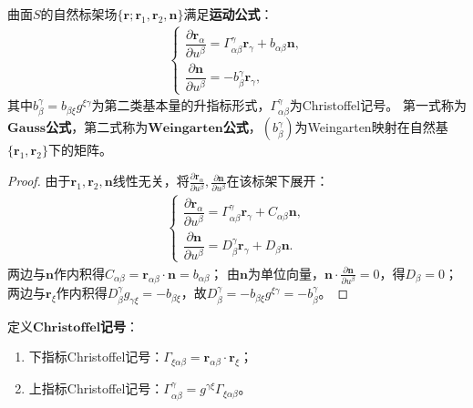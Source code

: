 \documentclass[../../main.tex]{subfiles}%
\begin{document}
\begin{theorem}
曲面$S$的自然标架场$\{\boldsymbol{r};\boldsymbol{r}_1,\boldsymbol{r}_2,\boldsymbol{n}\}$满足\textbf{运动公式}：
\begin{align}
\begin{cases}
\dfrac{\partial \boldsymbol{r}_\alpha}{\partial u^\beta}=\Gamma^\gamma_{\alpha\beta}\boldsymbol{r}_\gamma+b_{\alpha\beta}\boldsymbol{n},\\
\dfrac{\partial \boldsymbol{n}}{\partial u^\beta}=-b^\gamma_\beta\boldsymbol{r}_\gamma,
\end{cases}\label{eq:frame_motion}
\end{align}
其中$b^\gamma_\beta=b_{\beta\xi}g^{\xi\gamma}$为第二类基本量的升指标形式，$\Gamma^\gamma_{\alpha\beta}$为Christoffel记号。
第一式称为$\mathbf{Gauss}$\textbf{公式}，第二式称为$\mathbf{Weingarten}$\textbf{公式}，$(b^\gamma_\beta)$为Weingarten映射在自然基$\{\boldsymbol{r}_1,\boldsymbol{r}_2\}$下的矩阵。
\end{theorem}
\begin{proof}

由于$\boldsymbol{r}_1,\boldsymbol{r}_2,\boldsymbol{n}$线性无关，将$\frac{\partial \boldsymbol{r}_\alpha}{\partial u^\beta},\frac{\partial \boldsymbol{n}}{\partial u^\beta}$在该标架下展开：
\begin{align*}
\begin{cases}
\dfrac{\partial \boldsymbol{r}_\alpha}{\partial u^\beta}=\Gamma^\gamma_{\alpha\beta}\boldsymbol{r}_\gamma+C_{\alpha\beta}\boldsymbol{n},\\
\dfrac{\partial \boldsymbol{n}}{\partial u^\beta}=D^\gamma_\beta\boldsymbol{r}_\gamma+D_\beta\boldsymbol{n}.
\end{cases}
\end{align*}
两边与$\boldsymbol{n}$作内积得$C_{\alpha\beta}=\boldsymbol{r}_{\alpha\beta}\cdot\boldsymbol{n}=b_{\alpha\beta}$；
由$\boldsymbol{n}$为单位向量，$\boldsymbol{n}\cdot\frac{\partial \boldsymbol{n}}{\partial u^\beta}=0$，得$D_\beta=0$；
两边与$\boldsymbol{r}_\xi$作内积得$D^\gamma_\beta g_{\gamma\xi}=-b_{\beta\xi}$，故$D^\gamma_\beta=-b_{\beta\xi}g^{\xi\gamma}=-b^\gamma_\beta$。

\end{proof}

\begin{definition}
定义$\mathbf{Christoffel}$\textbf{记号}：
\begin{enumerate}[(1)]
\item 下指标Christoffel记号：$\Gamma_{\xi\alpha\beta}=\boldsymbol{r}_{\alpha\beta}\cdot\boldsymbol{r}_\xi$；
\item 上指标Christoffel记号：$\Gamma^\gamma_{\alpha\beta}=g^{\gamma\xi}\Gamma_{\xi\alpha\beta}$。
\end{enumerate}
\end{definition}
\end{document}
